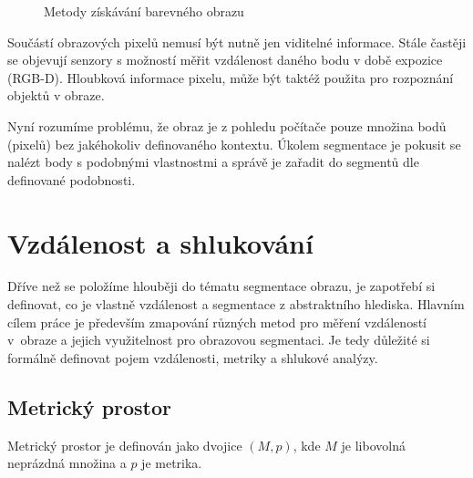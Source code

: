 \documentclass[czech, master, public, dept460, male, cpdeclaration, oneside]{diploma}
\begin{document}
\begin{figure}[H]
	\vspace*{+3.0mm}
	\centering
	\qquad
	\caption{Metody získávání barevného obrazu}
\end{figure}

\noindent
Součástí obrazových pixelů nemusí být nutně jen viditelné informace. Stále častěji se objevují senzory s možností měřit vzdálenost daného bodu v době expozice (RGB-D). Hloubková informace pixelu, může být taktéž použita pro rozpoznání objektů v obraze.\par
Nyní rozumíme problému, že obraz je z pohledu počítače pouze množina bodů (pixelů) bez jakéhokoliv definovaného kontextu. Úkolem segmentace je pokusit se nalézt body s podobnými vlastnostmi a správě je zařadit do segmentů dle definované podobnosti.

\section{Vzdálenost a shlukování}
Dříve než se položíme hlouběji do tématu segmentace obrazu, je zapotřebí si definovat, co je vlastně vzdálenost a segmentace z abstraktního hlediska. Hlavním cílem práce je především zmapování různých metod pro měření vzdáleností v obraze a jejich využitelnost pro obrazovou segmentaci. Je tedy důležité si formálně definovat pojem vzdálenosti, metriky a shlukové analýzy.

\subsection{Metrický prostor}
Metrický prostor je definován jako dvojice $(M, p)$, kde $M$ je libovolná neprázdná množina a $p$ je metrika.
\end{document}
